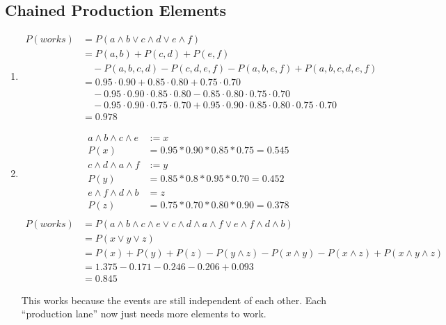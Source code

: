 \documentclass[fleqn,12pt]{scrartcl}
\begin{document}
\subsection{Chained Production Elements}
\begin{enumerate}
	\item
\begin{align*}
	P(works) &= P(a\wedge b \vee c\wedge d \vee e\wedge f)\\
							 &= P(a, b) + P(c, d) + P (e, f) \\ &\quad- P(a,b,c,d) - P(c,d,e,f) - P(a,b,e,f) + P(a,b,c,d,e,f)\\
								 &=0.95\cdot 0.90 + 0.85 \cdot 0.80 + 0.75\cdot0.70 \\
					 &\quad- 0.95\cdot0.90\cdot0.85\cdot0.80 - 0.85\cdot0.80\cdot0.75\cdot0.70\\
								 &\quad- 0.95\cdot0.90\cdot0.75\cdot0.70 + 0.95\cdot0.90\cdot0.85\cdot0.80\cdot0.75\cdot0.70 \\
					 &=0.978
\end{align*}
\item
	\begin{align*}
		a\wedge b \wedge c \wedge e &:= x\\
		P(x) &= 0.95*0.90*0.85*0.75 = 0.545\\
		c \wedge d \wedge a \wedge f &:= y\\
		P(y) &= 0.85 * 0.8 * 0.95 * 0.70 = 0.452\\
		e \wedge f \wedge d \wedge b &= z\\
		P(z) &= 0.75 * 0.70 * 0.80 * 0.90 = 0.378\\
	\end{align*}
	\begin{align*}
		P(works) &= P(a\wedge b\wedge c\wedge e \vee c\wedge d \wedge a \wedge f \vee e\wedge f\wedge d \wedge b)\\
										&= P(x \vee y \vee z)\\
						 &= P(x) + P(y) + P(z) - P(y \wedge z) - P(x \wedge y) - P(x \wedge z) + P(x \wedge y \wedge z)\\
						 &= 1.375 - 0.171 - 0.246 - 0.206 + 0.093\\
						 &= 0.845
	\end{align*}

	This works because the events are still independent of each other. Each \enquote{production lane} now just needs more elements to work.
\end{enumerate}
\end{document}
